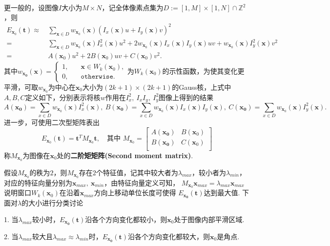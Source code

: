 \documentclass[12pt, a4paper, oneside]{ctexart}
\numberwithin{equation}{section}  %
\theoremstyle{definition}
\def\bd{\boldsymbol}        %
\def\Z{\mathbb{Z}}          %
\def\add{\vspace{1ex}}      %
\begin{document}
更一般的，设图像$I$大小为$M\times N$，记全体像素点集为$D:=[1,M]\times [1,N]\cap \Z^2$，则
\begin{align*}
    E_{\bd{x}_0}(\bd{t})\approx&\ \sum_{\bd{x}\in D}w_{\bd{x}_0}(\bd{x})\left(I_x(\bd{x})u+I_y(\bd{x})v\right)^2\\
    =&\ \sum_{\bd{x}\in D}w_{\bd{x}_0}(\bd{x})I_x^2(\bd{x})u^2+ 2w_{\bd{x}_0}(\bd{x})I_x(\bd{x})I_y(\bd{x})uv+w_{\bd{x}_0}(\bd{x})I_y^2(\bd{x})v^2\\
    =&\ A(\bd{x}_0)u^2+2B(\bd{x}_0)uv+C(\bd{x}_0)v^2.
\end{align*}
其中$w_{\bd{x_0}}(\bd{x}) = \begin{cases}
    1,&\quad \bd{x}\in W_k(\bd{x}_0),\\
    0,&\quad \texttt{otherwise}.
\end{cases}$为$W_k(\bd{x}_0)$的示性函数，\add 为使其变化更平滑，可取$w_{\bd{x}_0}$为中心在$\bd{x}_0$大小为$(2k+1)\times (2k+1)$的Gauss核，上式中$A,B,C$定义如下，分别表示将核$w$作用在$I_x^2,\ I_xI_y,\ I_y^2$图像上得到的结果
\begin{equation*}
A(\bd{x_0}) = \sum_{x\in D}w_{\bd{x}_0}(\bd{x})I_x^2(\bd{x}),\ B(\bd{x_0}) = \sum_{x\in D}w_{\bd{x}_0}(\bd{x})I_x(\bd{x})I_y(\bd{x}),\ C(\bd{x_0}) = \sum_{x\in D}w_{\bd{x}_0}(\bd{x})I_y^2(\bd{x}).
\end{equation*}
进一步，可使用二次型矩阵表出
\begin{equation*}
    E_{\bd{x}_0}(\bd{t}) = \bd{t}^TM_{\bd{x}_0}\bd{t},\quad \text{其中 }M_{\bd{x}_0}=\left[\begin{matrix}
        A(\bd{x_0})&B(\bd{x}_0)\\
        B(\bd{x_0})&C(\bd{x}_0)\\
    \end{matrix}\right]
\end{equation*}
称$M_{\bd{x}_0}$为图像在$\bd{x}_0$处的\textbf{二阶矩矩阵(Second moment matrix)}.

假设$M_{\bd{x}_0}$的秩为$2$，则$M_{\bd{x}_0}$存在$2$个特征值，记其中较大者为$\lambda_{max}$，较小者为$\lambda_{min}$，
对应的特征向量分别为$\bd{x}_{max},\ \bd{x}_{min}$，由特征向量定义可知，
$M_{\bd{x}_0}\bd{x}_{max} = \lambda_{max}\bd{x}_{max}$说明窗口$W_k(\bd{x}_0)$在沿着$\bd{x}_{max}$方向上移动单位长度可使得
$E_{\bd{x_0}}(\bd{t})$达到最大值. 下面对$\lambda$的大小进行分类讨论

1. 当$\lambda_{max}$较小时，$E_{\bd{x_0}}(\bd{t})$沿各个方向变化都较小，则$\bd{x}_0$处于图像内部平滑区域.

2. 当$\lambda_{max}$较大且$\lambda_{max}\approx\lambda_{min}$时，$E_{\bd{x_0}}(\bd{t})$沿各个方向变化都较大，则$\bd{x}_0$是角点.
\end{document}

